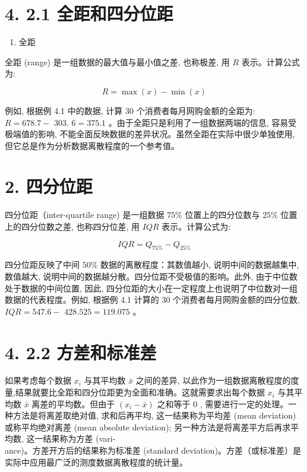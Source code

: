\documentclass[10pt]{article}
\begin{document}
\begin{CJK*}{UTF8}{bsmi}
\section*{4. 2.1 全距和四分位距}
\begin{enumerate}
  \item 全距
\end{enumerate}

全距 (range) 是一组数据的最大值与最小值之差, 也称极差, 用 $R$ 表示。计算公式为:


\begin{equation*}
R=\max (x)-\min (x) \tag{4.9}
\end{equation*}


例如, 根据例 4.1 中的数据, 计算 30 个消费者每月网购金额的全距为: $R=678.7-$ 303. $6=375.1$ 。由于全距只是利用了一组数据两端的信息, 容易受极端值的影响, 不能全面反映数据的差异状况。虽然全距在实际中很少单独使用, 但它总是作为分析数据离散程度的一个参考值。

\section*{2. 四分位距}
四分位距（inter-quartile range) 是一组数据 $75 \%$ 位置上的四分位数与 $25 \%$ 位置上的四分位数之差, 也称四分位差, 用 $I Q R$ 表示。计算公式为:


\begin{equation*}
I Q R=Q_{75 \%}-Q_{25 \%} \tag{4.10}
\end{equation*}


四分位距反映了中间 $50 \%$ 数据的离散程度：其数值越小, 说明中间的数据越集中, 数值越大, 说明中间的数据越分散。四分位距不受极值的影响。此外, 由于中位数处于数据的中间位置, 因此, 四分位距的大小在一定程度上也说明了中位数对一组数据的代表程度。例如, 根据例 4.1 计算的 30 个消费者每月网购金额的四分位数, $I Q R=547.6-$ $428.525=119.075$ 。

\section*{4. 2.2 方差和标准差}
如果考虑每个数据 $x_{i}$ 与其平均数 $\bar{x}$ 之间的差异, 以此作为一组数据离散程度的度量,结果就要比全距和四分位距更为全面和准确。这就需要求出每个数据 $x_{i}$ 与其平均数 $\bar{x}$ 离差的平均数。但由于 $\left(x_{i}-\bar{x}\right)$ 之和等于 0 , 需要进行一定的处理。一种方法是将离差取绝对值, 求和后再平均, 这一结果称为平均差 (mean deviation) 或称平均绝对离差 (mean absolute deviation); 另一种方法是将离差平方后再求平均数, 这一结果称为方差 (vari-\\
ance)。方差开方后的结果称为标准差 (standard deviation)。方差（或标准差）是实际中应用最广泛的测度数据离散程度的统计量。


\end{CJK*}
\end{document}
